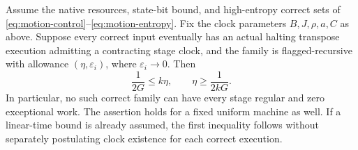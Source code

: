 \begin{theorem}
\label{thm:motion-exceptional-recursion}
Assume the native resources, state-bit bound, and high-entropy correct sets
of \eqref{eq:motion-control}--\eqref{eq:motion-entropy}.  Fix the clock
parameters $B,J,\rho,a,C$ as above.  Suppose every correct input eventually
has an actual halting transpose execution admitting a contracting stage
clock, and the family is flagged-recursive with allowance
$(\eta,\varepsilon_i)$, where $\varepsilon_i\to0$.  Then
\begin{equation}
\label{eq:motion-native-exception}
 \frac1{2G}\le k\eta,\qquad \eta\ge\frac1{2kG}.
\end{equation}
In particular, no such correct family can have every stage regular and zero
exceptional work.  The assertion holds for a fixed uniform machine as well.
If a linear-time bound is already assumed, the first inequality follows
without separately postulating clock existence for each correct execution.
\end{theorem}

